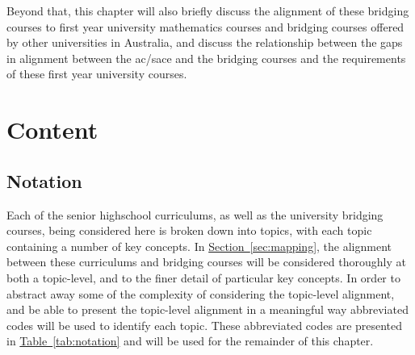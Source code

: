 \documentclass[twoside,12pt,a4paper]{report}
\newcommand{\refsec}[1]{\hyperref[sec:#1]{Section~\ref{sec:#1}}}
\newcommand{\reftab}[1]{\hyperref[tab:#1]{Table~\ref{tab:#1}}}
\begin{document}
Beyond that, this chapter will also briefly discuss the alignment of these bridging courses to first year university mathematics courses and bridging courses offered by other universities in Australia, and discuss the relationship between the gaps in alignment between the \gls{ac}/\gls{sace} and the bridging courses and the requirements of these first year university courses. 


\section{Content}
\label{sec:content}

\subsection{Notation}

Each of the senior highschool curriculums, as well as the university bridging courses, being considered here is broken down into topics, with each topic containing a number of key concepts. In \refsec{mapping}, the alignment between these curriculums and bridging courses will be considered thoroughly at both a topic-level, and to the finer detail of particular key concepts. In order to abstract away some of the complexity of considering the topic-level alignment, and be able to present the topic-level alignment in a meaningful way abbreviated codes will be used to identify each topic. These abbreviated codes are presented in \reftab{notation} and will be used for the remainder of this chapter.
\end{document}
